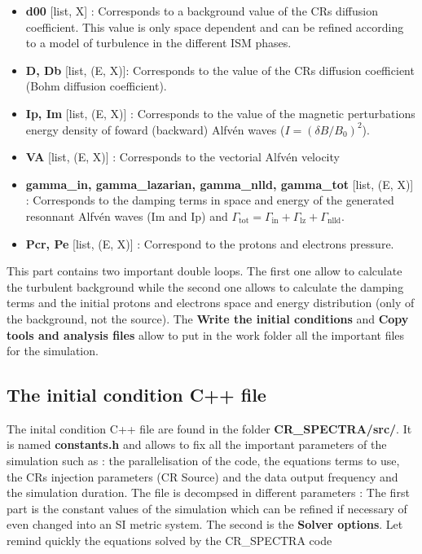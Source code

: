         \begin{itemize}
            \item {\bf{d00}} [list, X] : Corresponds to a background value of the CRs diffusion coefficient. This value is only space dependent and can be refined according to a 
                            model of turbulence in the different ISM phases. 
            \item {\bf{D, Db}} [list, (E, X)]: Corresponds to the value of the CRs diffusion coefficient (Bohm diffusion coefficient). 
            \item {\bf{Ip, Im}} [list, (E, X)] : Corresponds to the value of the magnetic perturbations energy density of foward (backward) Alfvén waves 
                                            ($I = (\delta B / B_0)^2$).  
            \item {\bf{VA}} [list, (E, X)] : Corresponds to the vectorial Alfvén velocity 
            \item {\bf{gamma\_in, gamma\_lazarian, gamma\_nlld, gamma\_tot}} [list, (E, X)] : Corresponds to the damping terms in space and energy of the generated resonnant 
                                            Alfvén waves (Im and Ip) and $\Gamma_\mathrm{tot} = \Gamma_\mathrm{in} + \Gamma_\mathrm{lz}  +\Gamma_\mathrm{nlld}$. 
            \item {\bf{Pcr, Pe}} [list, (E, X)] : Correspond to the protons and electrons pressure. 
        \end{itemize}

        \noi This part contains two important double loops. The first one allow to calculate the turbulent background while the second one allows to calculate the 
        damping terms and the initial protons and electrons space and energy distribution (only of the background, not the source). The {\bf{Write the initial conditions}}
        and {\bf{Copy tools and analysis files}} allow to put in the work folder all the important files for the simulation. 


    \subsection{The initial condition C++ file}

        The inital condition C++ file are found in the folder {\bf{CR\_SPECTRA/src/}}. It is named {\bf{constants.h}} and allows to fix all the important parameters 
        of the simulation such as : the parallelisation of the code, the equations terms to use, the CRs injection parameters (CR Source) and the data output frequency 
        and the simulation duration. The file is decompsed in different parameters : The first part is the constant values of the simulation which can be refined if necessary 
        of even changed into an SI metric system. The second is the {\bf{Solver options}}. Let remind quickly the equations solved by the CR\_SPECTRA code 
        
